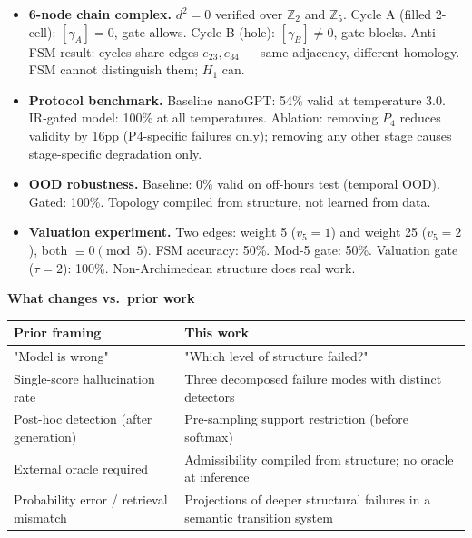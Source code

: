\documentclass[11pt,a4paper]{article}
\begin{document}
\begin{itemize}[noitemsep,topsep=4pt]
  \item \textbf{6-node chain complex.}
        $d^2=0$ verified over $\mathbb{Z}_2$ and $\mathbb{Z}_5$.
        Cycle A (filled 2-cell): $[\gamma_A]=0$, gate allows.
        Cycle B (hole): $[\gamma_B]\neq 0$, gate blocks.
        Anti-FSM result: cycles share edges $e_{23},e_{34}$ ---
        same adjacency, different homology.
        FSM cannot distinguish them; $H_1$ can.

  \item \textbf{Protocol benchmark.}
        Baseline nanoGPT: 54\% valid at temperature 3.0.
        IR-gated model: 100\% at all temperatures.
        Ablation: removing $P_4$ reduces validity by 16pp
        (P4-specific failures only); removing any other stage
        causes stage-specific degradation only.

  \item \textbf{OOD robustness.}
        Baseline: 0\% valid on off-hours test (temporal OOD).
        Gated: 100\%. Topology compiled from structure, not learned from data.

  \item \textbf{Valuation experiment.}
        Two edges: weight 5 ($v_5=1$) and weight 25 ($v_5=2$),
        both $\equiv 0 \pmod{5}$.
        FSM accuracy: 50\%. Mod-5 gate: 50\%.
        Valuation gate ($\tau=2$): 100\%.
        Non-Archimedean structure does real work.
\end{itemize}

\vspace{8pt}

\noindent\textbf{What changes vs.\ prior work}

\begin{tabular}{p{4.5cm}p{8cm}}
\toprule
\textbf{Prior framing} & \textbf{This work} \\
\midrule
"Model is wrong" &
  "Which level of structure failed?" \\
Single-score hallucination rate &
  Three decomposed failure modes with distinct detectors \\
Post-hoc detection (after generation) &
  Pre-sampling support restriction (before softmax) \\
External oracle required &
  Admissibility compiled from structure; no oracle at inference \\
Probability error / retrieval mismatch &
  Projections of deeper structural failures in a semantic transition system \\
\bottomrule
\end{tabular}
\end{document}
